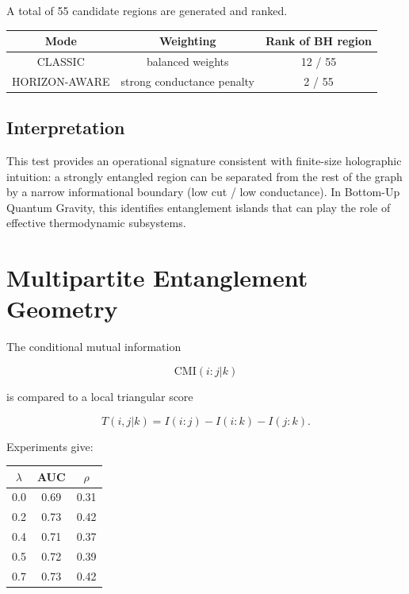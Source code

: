 \documentclass[11pt]{article}
\begin{document}
A total of 55 candidate regions are generated and ranked.

\begin{center}
\begin{tabular}{ccc}
\toprule
Mode & Weighting & Rank of BH region \\
\midrule
CLASSIC & balanced weights & 12 / 55 \\
HORIZON-AWARE & strong conductance penalty & 2 / 55 \\
\bottomrule
\end{tabular}
\end{center}

\subsection{Interpretation}

This test provides an operational signature consistent with
finite-size holographic intuition: a strongly entangled region can
be separated from the rest of the graph by a narrow informational
boundary (low cut / low conductance). In Bottom-Up Quantum Gravity,
this identifies entanglement islands that can play the role of
effective thermodynamic subsystems.


\section{Multipartite Entanglement Geometry}

The conditional mutual information

\[
\mathrm{CMI}(i:j|k)
\]

is compared to a local triangular score

\[
T(i,j|k)=I(i:j)-I(i:k)-I(j:k).
\]

Experiments give:

\begin{center}
\begin{tabular}{ccc}
\toprule
$\lambda$ & AUC & $\rho$ \\
\midrule
0.0 & 0.69 & 0.31 \\
0.2 & 0.73 & 0.42 \\
0.4 & 0.71 & 0.37 \\
0.5 & 0.72 & 0.39 \\
0.7 & 0.73 & 0.42 \\
\bottomrule
\end{tabular}
\end{center}
\end{document}

